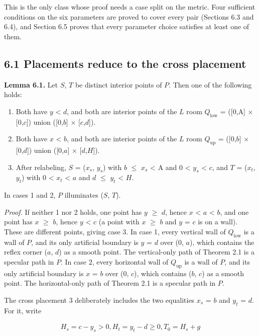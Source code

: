 \documentclass[11pt]{article}
\begin{document}
This is the only class whose proof needs a case split on the metric. Four sufficient conditions on the six parameters are proved to cover every pair (Sections 6.3 and 6.4), and Section 6.5 proves that every parameter choice satisfies at least one of them.

\subsection*{6.1 Placements reduce to the cross placement}
\textbf{Lemma 6.1.} Let \(S\), \(T\) be distinct interior points of \(P\). Then one of the following holds:

\begin{enumerate}
\item Both have \(y\) < \(d\), and both are interior points of the \(L\) room \(Q_{\mathrm{low}}\) = ([0,A] \(\times\) [0,\(c\)]) union ([0,\(b\)] \(\times\) [\(c\),\(d\)]).
\item Both have \(x\) < \(b\), and both are interior points of the \(L\) room \(Q_{\mathrm{up}}\) = ([0,\(b\)] \(\times\) [0,\(d\)]) union ([0,\(a\)] \(\times\) [\(d\),\(H\)]).
\item After relabeling, \(S\) = (\(x_{s}\), \(y_{s}\)) with \(b\) \(\le\) \(x_{s}\) < A and 0 < \(y_{s}\) < \(c\), and \(T\) = (\(x_{t}\), \(y_{t}\)) with 0 < \(x_{t}\) < \(a\) and \(d\) \(\le\) \(y_{t}\) < \(H\).
\end{enumerate}
In cases 1 and 2, \(P\) illuminates (\(S\), \(T\)).

\emph{Proof.} If neither 1 nor 2 holds, one point has \(y\) \(\ge\) \(d\), hence \(x\) < \(a\) < \(b\), and one point has \(x\) \(\ge\) \(b\), hence \(y\) < \(c\) (a point with \(x\) \(\ge\) \(b\) and \(y\) = \(c\) is on a wall). These are different points, giving case 3. In case 1, every vertical wall of \(Q_{\mathrm{low}}\) is a wall of \(P\), and its only artificial boundary is \(y\) = \(d\) over (0, \(a\)), which contains the reflex corner (\(a\), \(d\)) as a smooth point. The vertical-only path of Theorem 2.1 is a specular path in \(P\). In case 2, every horizontal wall of \(Q_{\mathrm{up}}\) is a wall of \(P\), and its only artificial boundary is \(x\) = \(b\) over (0, \(c\)), which contains (\(b\), \(c\)) as a smooth point. The horizontal-only path of Theorem 2.1 is a specular path in \(P\).

The cross placement 3 deliberately includes the two equalities \(x_{s}\) = \(b\) and \(y_{t}\) = \(d\). For it, write

\begin{gather*}
H_{s} = c - y_{s} > 0,   H_{t} = y_{t} - d \ge  0,   T_{0} = H_{s} + g
\end{gather*}
\end{document}
